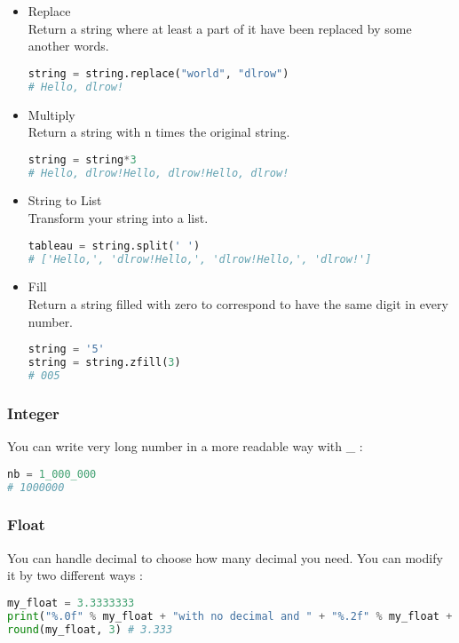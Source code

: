 \documentclass[a4paper, 12pt]{article}
\begin{document}
\begin{itemize}
\item Replace \\
Return a string where at least a part of it have been replaced by some another words.
\begin{lstlisting}[language=Python]
string = string.replace("world", "dlrow")
# Hello, dlrow!
\end{lstlisting}

\item Multiply \\
Return a string with n times the original string.
\begin{lstlisting}[language=Python]
string = string*3
# Hello, dlrow!Hello, dlrow!Hello, dlrow!
\end{lstlisting}

\item String to List \\
Transform your string into a list.
\begin{lstlisting}[language=Python]
tableau = string.split(' ')
# ['Hello,', 'dlrow!Hello,', 'dlrow!Hello,', 'dlrow!']
\end{lstlisting}

\item Fill \\
Return a string filled with zero to correspond to have the same digit in every number.
\begin{lstlisting}[language=Python]
string = '5'
string = string.zfill(3)
# 005
\end{lstlisting}
\end{itemize}

\subsubsection{Integer}
You can write very long number in a more readable way with \_ : 
\begin{lstlisting}[language=Python]
nb = 1_000_000
# 1000000
\end{lstlisting}

\subsubsection{Float}
You can handle decimal to choose how many decimal you need. You can modify it by two different ways : 
\begin{lstlisting}[language=Python]
my_float = 3.3333333
print("%.0f" % my_float + "with no decimal and " + "%.2f" % my_float + "with two decimals") #3 with no decimal and 3.33 with two decimals
round(my_float, 3) # 3.333
\end{lstlisting}
\end{document}
